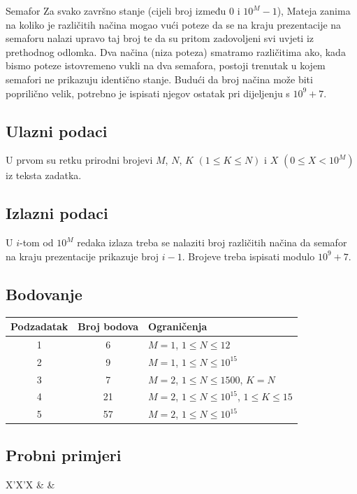 \begin{statement}[
  problempoints=100,
  timelimit=1 sekunda,
  memorylimit=512 MiB,
]{Semafor}
Za svako završno stanje (cijeli broj između $0$ i $10^M-1$), Mateja zanima na
koliko je različitih načina mogao vući poteze da se na kraju prezentacije na
semaforu nalazi upravo taj broj te da su pritom zadovoljeni svi uvjeti iz
prethodnog odlomka. Dva načina (niza poteza) smatramo različitima ako, kada
bismo poteze istovremeno vukli na dva semafora, postoji trenutak u kojem
semafori ne prikazuju identično stanje. Budući da broj načina može biti
poprilično velik, potrebno je ispisati njegov ostatak pri dijeljenju s $10^9+7$.
\subsection*{Ulazni podaci}
U prvom su retku prirodni brojevi $M$, $N$, $K$ $(1 \le K \le N)$ i $X$ $(0
\le X < 10^M)$ iz teksta zadatka.

\subsection*{Izlazni podaci}
U $i$-tom od $10^M$ redaka izlaza treba se nalaziti broj različitih načina da
semafor na kraju prezentacije prikazuje broj $i-1$. Brojeve treba ispisati
modulo $10^9 + 7$.

\subsection*{Bodovanje}
{\renewcommand{\arraystretch}{1.4}
  \setlength{\tabcolsep}{6pt}
  \begin{tabular}{ccl}
 Podzadatak & Broj bodova & Ograničenja \\ \midrule
  1 & 6 & $M=1$, $1 \le N \le 12$ \\
  2 & 9 & $M=1$, $1 \le N \le 10^{15}$ \\
  3 & 7 & $M=2$, $1 \le N \le 1500$, $K = N$\\
  4 & 21 & $M=2$, $1 \le N \le 10^{15}$, $1 \le K \le 15$ \\
  5 & 57 & $M=2$, $1 \le N \le 10^{15}$ \\
\end{tabular}}

\subsection*{Probni primjeri}
\begin{tabularx}{\textwidth}{X'X'X}
 &
 &
\end{tabularx}

\end{statement}

